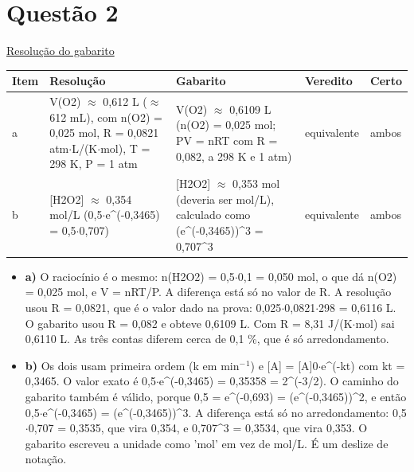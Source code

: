 \documentclass{article}%
\begin{document}
\section*{Questão 2}%
\href{https://poliedroresolve.sistemapoliedro.com.br/vestibulares/ita/2026/ita-2-fase-dia-2-29-10-2025-2-fase-dia-2/dissertativa-2-quimica-2-fase-dia-2-ita-2026}{Resolução do gabarito}\par\smallskip%
\begin{longtable}{@{}p{} p{} p{} p{} p{}@{}}\toprule Item & Resolução & Gabarito & Veredito & Certo \\ \midrule
a & V(O2) $\approx$ 0,612 L ($\approx$ 612 mL), com n(O2) = 0,025 mol, R = 0,0821 atm$\cdot$L/(K$\cdot$mol), T = 298 K, P = 1 atm & V(O2) $\approx$ 0,6109 L (n(O2) = 0,025 mol; PV = nRT com R = 0,082, a 298 K e 1 atm) & equivalente & ambos \\
b & {[}H2O2{]} $\approx$ 0,354 mol/L (0,5$\cdot$e\^{}(-0,3465) = 0,5$\cdot$0,707) & {[}H2O2{]} $\approx$ 0,353 mol (deveria ser mol/L), calculado como (e\^{}(-0,3465))\^{}3 = 0,707\^{}3 & equivalente & ambos \\
\bottomrule\end{longtable}%
\begin{itemize}%
\item%
\textbf{a)} O raciocínio é o mesmo: n(H2O2) = 0,5$\cdot$0,1 = 0,050 mol, o que dá n(O2) = 0,025 mol, e V = nRT/P. A diferença está só no valor de R. A resolução usou R = 0,0821, que é o valor dado na prova: 0,025$\cdot$0,0821$\cdot$298 = 0,6116 L. O gabarito usou R = 0,082 e obteve 0,6109 L. Com R = 8,31 J/(K$\cdot$mol) sai 0,6110 L. As três contas diferem cerca de 0,1 \%, que é só arredondamento.%
\item%
\textbf{b)} Os dois usam primeira ordem (k em min$^{-}$$^{1}$) e {[}A{]} = {[}A{]}0$\cdot$e\^{}(-kt) com kt = 0,3465. O valor exato é 0,5$\cdot$e\^{}(-0,3465) = 0,35358 = 2\^{}(-3/2). O caminho do gabarito também é válido, porque 0,5 = e\^{}(-0,693) = (e\^{}(-0,3465))\^{}2, e então 0,5$\cdot$e\^{}(-0,3465) = (e\^{}(-0,3465))\^{}3. A diferença está só no arredondamento: 0,5$\cdot$0,707 = 0,3535, que vira 0,354, e 0,707\^{}3 = 0,3534, que vira 0,353. O gabarito escreveu a unidade como 'mol' em vez de mol/L. É um deslize de notação.%
\end{itemize}%
\end{document}
